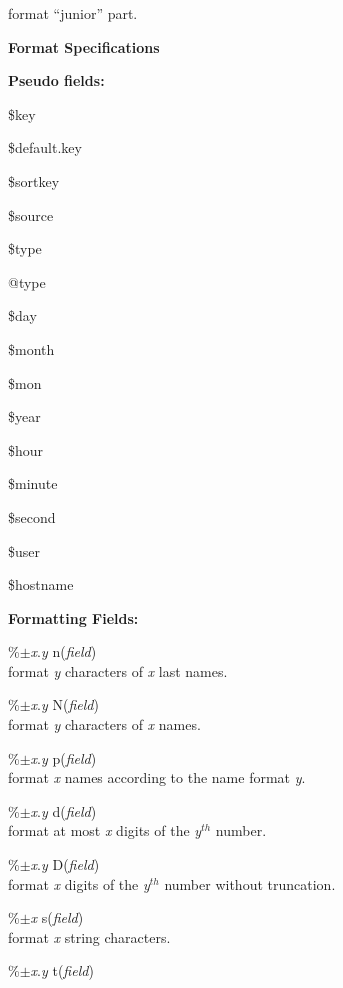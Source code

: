 \documentclass[a4paper]{article}
\newenvironment{FlatList}{\begin{list}{}{%
      \topsep=0pt\itemsep=0pt\parsep=0pt\let\makelabel=\flatlistlabel}}{\end{list}}%
\newcommand\flatlistlabel[1]{\descriptionlabel{\textsf{#1}}}
\newcommand\Section[1]{\begin{center}\normalsize\bfseries
    #1\end{center}\nobreak }
\begin{document}
\begin{multicols}{4}
\begin{FlatList}
    format ``junior'' part.
  \end{FlatList}
  \Section{Format Specifications}
  \textbf{Pseudo fields:} 
  \begin{FlatList}
  \item [\$key]
  \item [\$default.key]
  \item [\$sortkey]
  \item [\$source]
  \item [\$type]
  \item [@type]
  \item [\$day]
  \item [\$month]
  \item [\$mon]
  \item [\$year]
  \item [\$hour]
  \item [\$minute]
  \item [\$second]
  \item [\$user]
  \item [\$hostname]
  \end{FlatList}
  \textbf{Formatting Fields:} 
  \begin{FlatList}
  \item [\%$\pm $\textit{x}.\textit{y}\/ n(\textit{field}\/)]\ \\
    format \textit{y}\/ characters of \textit{x}\/ last names.
  \item [\%$\pm $\textit{x}.\textit{y}\/ N(\textit{field}\/)]\ \\
    format \textit{y}\/ characters of \textit{x}\/ names.
  \item [\%$\pm $\textit{x}.\textit{y}\/ p(\textit{field}\/)]\ \\
    format \textit{x}\/ names according to the name format \textit{y}.
  \item [\%$\pm $\textit{x}.\textit{y}\/ d(\textit{field}\/)]\ \\
    format at most \textit{x}\/ digits of the \textit{y}$^{th}$ number.
  \item [\%$\pm $\textit{x}.\textit{y}\/ D(\textit{field}\/)]\ \\
    format \textit{x}\/ digits of the \textit{y}$^{th}$ number without truncation.
  \item [\%$\pm $\textit{x}\/ s(\textit{field}\/)]\ \\
    format \textit{x}\/ string characters.
  \item [\%$\pm $\textit{x}.\textit{y}\/ t(\textit{field}\/)]\ \\

\end{FlatList}
\end{multicols}
\end{document}
